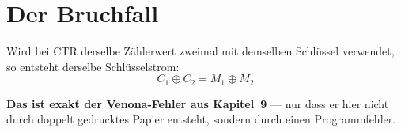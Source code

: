 \section{Der Bruchfall}

\begin{warnung}
Wird bei CTR derselbe Zählerwert zweimal mit demselben Schlüssel verwendet, so entsteht derselbe Schlüsselstrom:
\[ C_1 \oplus C_2 = M_1 \oplus M_2 \]

\begin{center}
\begin{minipage}{0.9\textwidth}
\textbf{Das ist exakt der Venona-Fehler aus Kapitel~9} --- nur dass er hier nicht durch doppelt gedrucktes Papier entsteht, sondern durch einen Programmfehler.
\end{minipage}
\end{center}

\begin{center}
\begin{minipage}{0.88\textwidth}
\end{minipage}
\end{center}
\end{warnung}

